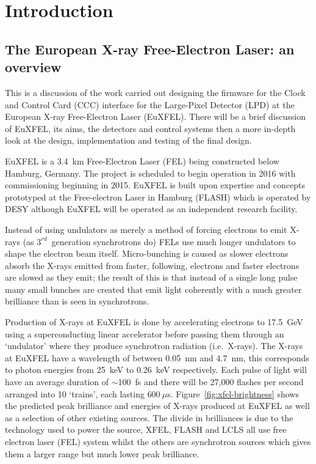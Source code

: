 \chapter{Introduction} %
\label{cha:lpd_ccc_introduction}
\section{The European X-ray Free-Electron Laser: an overview} %
\label{sec:xfel_an_overview}
This is a discussion of the work carried out designing the firmware for the Clock and Control Card (CCC) interface for the Large-Pixel Detector (LPD) at the European X-ray Free-Electron Laser (EuXFEL). There will be a brief discussion of EuXFEL, its aims, the detectors and control systems then a more in-depth look at the design, implementation and testing of the final design.

EuXFEL is a 3.4~km Free-Electron Laser (FEL) being constructed below Hamburg, Germany. The project is scheduled to begin operation in 2016 with commissioning beginning in 2015. EuXFEL is built upon expertise and concepts prototyped at the Free-electron Laser in Hamburg (FLASH) which is operated by DESY although EuXFEL will be operated as an independent research facility. 

Instead of using undulators as merely a method of forcing electrons to emit X-rays (as \(3^{rd}\)~generation synchrotrons do) FELs use much longer undulators to shape the electron beam itself. Micro-bunching is caused as slower electrons absorb the X-rays emitted from faster, following, electrons and faster electrons are slowed as they emit; the result of this is that instead of a single long pulse many small bunches are created that emit light coherently with a much greater brilliance than is seen in synchrotrons.

Production of X-rays at EuXFEL is done by accelerating electrons to 17.5~GeV using a superconducting linear accelerator before passing them through an `undulator' where they produce synchrotron radiation (i.e.\ X-rays). The X-rays at EuXFEL have a wavelength of between 0.05~nm and 4.7~nm, this corresponds to photon energies from 25~keV to 0.26~keV respectively. Each pulse of light will have an average duration of \(\sim\)100~fs and there will be 27,000 flashes per second arranged into 10 `trains', each lasting \(600~\mu\)s. Figure~\ref{fig:xfel-brightness} shows the predicted peak brilliance and energies of X-rays produced at EuXFEL as well as a selection of other existing sources. The divide in brilliances is due to the technology used to power the source, XFEL, FLASH and LCLS all use free electron laser (FEL) system whilst the others are synchrotron sources which gives them a larger range but much lower peak brilliance. 

